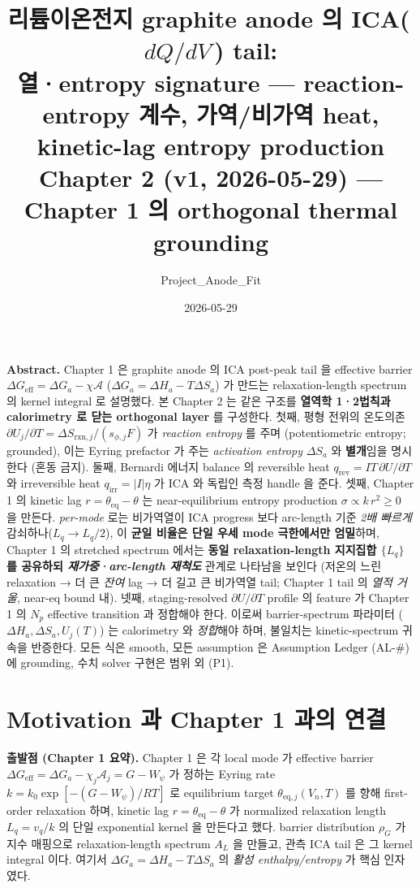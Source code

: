 \documentclass[11pt,a4paper]{article}
\title{\textbf{리튬이온전지 graphite anode 의 ICA(\,$dQ/dV$\,) tail:\\
열·entropy signature — reaction-entropy 계수, 가역/비가역 heat,
kinetic-lag entropy production}\\[0.4em]
\large Chapter 2 (v1, 2026-05-29) — Chapter 1 의 orthogonal thermal grounding}
\author{Project\_Anode\_Fit}
\date{2026-05-29}
\newcommand{\eff}{\mathrm{eff}}
\newcommand{\eq}{\mathrm{eq}}
\newcommand{\rxn}{\mathrm{rxn}}
\newcommand{\rev}{\mathrm{rev}}
\newcommand{\irr}{\mathrm{irr}}
\begin{document}
\maketitle

\begin{center}\begin{minipage}{0.93\textwidth}
\small \textbf{Abstract.} Chapter 1 은 graphite anode 의 ICA post-peak tail 을 effective
barrier $\Delta G_\eff=\Delta G_a-\chi\mathcal A$ ($\Delta G_a=\Delta H_a-T\Delta S_a$) 가 만드는
relaxation-length spectrum 의 kernel integral 로 설명했다. 본 Chapter 2 는 같은 구조를
\textbf{열역학 1·2법칙과 calorimetry 로 닫는 orthogonal layer} 를 구성한다. 첫째, 평형 전위의
온도의존 $\partial U_j/\partial T=\Delta S_{\rxn,j}/(s_{\phi,j}F)$ 가 \emph{reaction entropy} 를
주며 (potentiometric entropy; grounded), 이는 Eyring prefactor 가 주는 \emph{activation entropy}
$\Delta S_a$ 와 \textbf{별개}임을 명시한다 (혼동 금지). 둘째, Bernardi 에너지 balance 의 reversible
heat $q_\rev=IT\,\partial U/\partial T$ 와 irreversible heat $q_\irr=|I|\eta$ 가 ICA 와 독립인 측정
handle 을 준다. 셋째, Chapter 1 의 kinetic lag $r=\theta_\eq-\theta$ 는 near-equilibrium entropy
production $\sigma\propto k\,r^2\ge0$ 을 만든다. \emph{per-mode} 로는 비가역열이 ICA progress 보다
arc-length 기준 \emph{2배 빠르게} 감쇠하나($L_q\!\to\!L_q/2$), 이 \textbf{균일 비율은 단일 우세 mode
극한에서만 엄밀}하며, Chapter 1 의 stretched spectrum 에서는 \textbf{동일 relaxation-length 지지집합
$\{L_q\}$ 를 공유하되 \emph{재가중·arc-length 재척도}} 관계로 나타남을 보인다 (저온의 느린 relaxation
→ 더 큰 \emph{잔여} lag → 더 길고 큰 비가역열 tail; Chapter 1 tail 의 \emph{열적 거울}, near-eq bound 내). 넷째,
staging-resolved $\partial U/\partial T$ profile 의 feature 가 Chapter 1 의 $N_p$ effective
transition 과 정합해야 한다. 이로써 barrier-spectrum 파라미터 ($\Delta H_a,\Delta S_a,U_j(T)$) 는
calorimetry 와 \emph{정합}해야 하며, 불일치는 kinetic-spectrum 귀속을 반증한다. 모든 식은 smooth,
모든 assumption 은 Assumption Ledger (AL-\#) 에 grounding, 수치 solver 구현은 범위 외 (P1).
\end{minipage}\end{center}

\tableofcontents
\newpage

\section{Motivation 과 Chapter 1 과의 연결}\label{sec:intro}
\textbf{출발점 (Chapter 1 요약).} Chapter 1 은 각 local mode 가 effective barrier
$\Delta G_\eff=\Delta G_a-\chi_j\mathcal A_j=G-W_\psi$ 가 정하는 Eyring rate $k=k_0\exp[-(G-W_\psi)/RT]$
로 equilibrium target $\theta_{\eq,j}(V_n,T)$ 를 향해 first-order relaxation 하며, kinetic lag
$r=\theta_\eq-\theta$ 가 normalized relaxation length $L_q=v_q/k$ 의 단일 exponential kernel 을
만든다고 했다. barrier distribution $\rho_G$ 가 지수 매핑으로 relaxation-length spectrum $A_L$ 을
만들고, 관측 ICA tail 은 그 kernel integral 이다. 여기서 $\Delta G_a=\Delta H_a-T\Delta S_a$ 의
\emph{활성 enthalpy/entropy} 가 핵심 인자였다.
\end{document}
